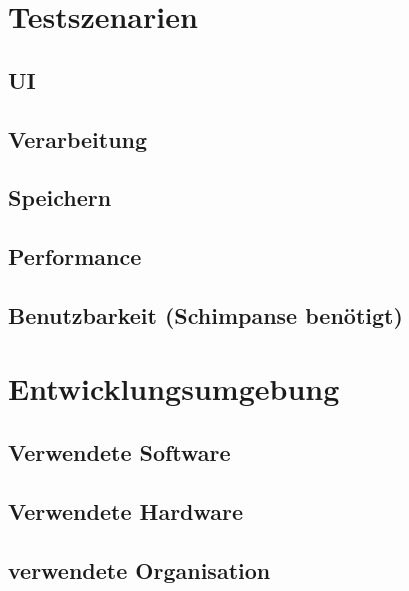 \documentclass[12pt]{article}
\begin{document}
\section{Testszenarien}
\subsection{UI}
\subsection{Verarbeitung}
\subsection{Speichern}
\subsection{Performance}
\subsection {Benutzbarkeit (Schimpanse benötigt)}
\pagebreak
\section{Entwicklungsumgebung}
\subsection{Verwendete Software}
\subsection{Verwendete Hardware}
\subsection{verwendete Organisation}


\pagebreak
\end{document}
